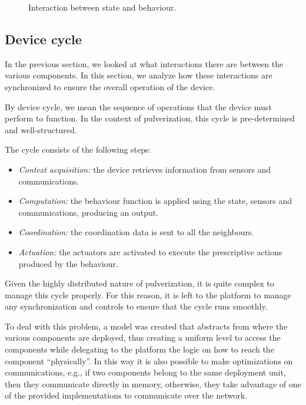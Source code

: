 \begin{figure}
	\centering
	\caption{Interaction between state and behaviour.}
	\label{fig:framework-components-interaction-2-state-behaviour}
\end{figure}

\subsection{Device cycle}
\label{sec:framework-device-cycle}

In the previous section, we looked at what interactions there are between the various components. In this section, we analyze how these interactions
are synchronized to ensure the overall operation of the device.

By device cycle, we mean the sequence of operations that the device must perform to function. In the context of pulverization, this cycle is
pre-determined and well-structured.

The cycle consists of the following steps:

\begin{itemize}
	\item \emph{Context acquisition:} the device retrieves information from sensors and communications.
	\item \emph{Computation:} the behaviour function is applied using the state, sensors and communications, producing an output.
	\item \emph{Coordination:} the coordination data is sent to all the neighbours.
	\item \emph{Actuation:} the actuators are activated to execute the prescriptive actions produced by the behaviour.
\end{itemize}

Given the highly distributed nature of pulverization, it is quite complex to manage this cycle properly. For this reason, it is left to the platform
to manage any synchronization and controls to ensure that the cycle runs smoothly.

To deal with this problem, a model was created that abstracts from where the various components are deployed, thus creating a uniform level
to access the components while delegating to the platform the logic on how to reach the component ``physically''. In this way it is also possible
to make optimizations on communications, e.g., if two components belong to the same deployment unit, then they communicate directly in memory,
otherwise, they take advantage of one of the provided implementations to communicate over the network.

